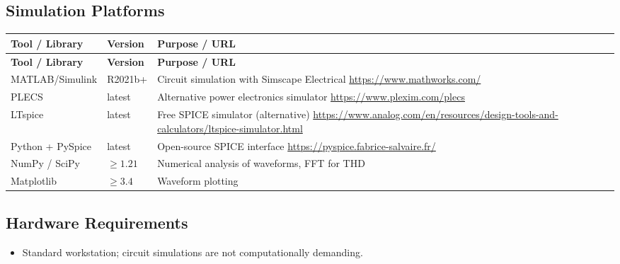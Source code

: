 \documentclass[11pt,a4paper]{article}
\begin{document}
\subsection{Simulation Platforms}
\begin{longtable}{p{4.5cm} p{2.5cm} p{6.5cm}}
\toprule
\textbf{Tool / Library} & \textbf{Version} & \textbf{Purpose / URL} \\
\midrule
\endfirsthead
\toprule
\textbf{Tool / Library} & \textbf{Version} & \textbf{Purpose / URL} \\
\midrule
\endhead
MATLAB/Simulink & R2021b+ & Circuit simulation with Simscape Electrical \newline \url{https://www.mathworks.com/} \\
\midrule
PLECS & latest & Alternative power electronics simulator \newline \url{https://www.plexim.com/plecs} \\
\midrule
LTspice & latest & Free SPICE simulator (alternative) \newline \url{https://www.analog.com/en/resources/design-tools-and-calculators/ltspice-simulator.html} \\
\midrule
Python + PySpice & latest & Open-source SPICE interface \newline \url{https://pyspice.fabrice-salvaire.fr/} \\
\midrule
NumPy / SciPy & $\geq 1.21$ & Numerical analysis of waveforms, FFT for THD \\
\midrule
Matplotlib & $\geq 3.4$ & Waveform plotting \\
\bottomrule
\end{longtable}

\subsection{Hardware Requirements}
\begin{itemize}
  \item Standard workstation; circuit simulations are not computationally demanding.
\end{itemize}
\end{document}
